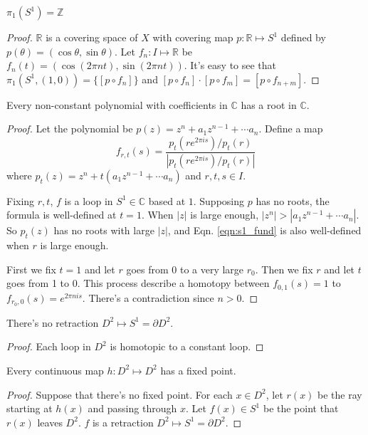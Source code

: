 \documentclass[12pt]{book}
\begin{document}
\begin{lemma}
	$\pi_1(S^1)=\mathbb Z$
\end{lemma}
\begin{proof}
	$\mathbb R$ is a covering space of $X$ with covering map $p:\mathbb R\mapsto S^1$ defined by $p(\theta)=(\cos\theta,\sin\theta)$. Let $f_n:I\mapsto \mathbb R$ be $f_n(t)=(\cos(2\pi nt),\sin(2\pi nt))$. It's easy to see that $\pi_1(S^1,(1,0))=\{[p\circ f_n]\}$ and $[p\circ f_n]\cdot[p\circ f_m]=[p\circ f_{n+m}]$.
\end{proof}

\begin{theorem}
	Every non-constant polynomial with coefficients in $\mathbb C$ has a root in $\mathbb C$.
\end{theorem}
\begin{proof}
	Let the polynomial be $p(z)=z^n+a_1 z^{n-1}+\cdots a_n$. Define a map
	\begin{equation}
		f_{r,t}(s)=\frac{p_t(re^{2\pi is})/p_t(r)}{|p_t(re^{2\pi is})/p_t(r)|}
		\label{eqn:s1_fund}
	\end{equation}
	where $p_t(z)=z^n+t(a_1 z^{n-1}+\cdots a_n)$ and $r,t,s\in I$.
	
	Fixing $r,t$, $f$ is a loop in $S^1\in\mathbb C$ based at $1$. Supposing $p$ has no roots, the formula is well-defined at $t=1$. When $|z|$ is large enough, $|z^n|>|a_1 z^{n-1}+\cdots a_n|$. So $p_t(z)$ has no roots with large $|z|$, and Eqn. \ref{eqn:s1_fund} is also well-defined when $r$ is large enough.
	
	First we fix $t=1$ and let $r$ goes from $0$ to a very large $r_0$. Then we fix $r$ and let $t$ goes from 1 to 0. This process describe a homotopy between $f_{0,1}(s)=1$ to $f_{r_0,0}(s)=e^{2\pi nis}$. There's a contradiction since $n>0$.
\end{proof}

\begin{lemma}
	There's no retraction $D^2\mapsto S^1=\partial D^2$.
\end{lemma}
\begin{proof}
	Each loop in $D^2$ is homotopic to a constant loop.
\end{proof}

\begin{theorem}
	Every continuous map $h:D^2\mapsto D^2$ has a fixed point.
\end{theorem}
\begin{proof}
	Suppose that there's no fixed point. For each $x\in D^2$, let $r(x)$ be the ray starting at $h(x)$ and passing through $x$. Let $f(x)\in S^1$ be the point that $r(x)$ leaves $D^2$. $f$ is a retraction $D^2\mapsto S^1=\partial D^2$.
\end{proof}
\end{document}
